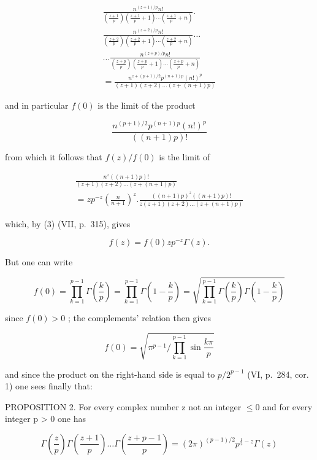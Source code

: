 \[
\begin{array}{c} \frac {n ^ {(z + 1) / p} n !}{\left(\frac {z + 1}{p}\right) \left(\frac {z + 1}{p} + 1\right) \cdots \left(\frac {z + 1}{p} + n\right)}. \\ \frac {n ^ {(z + 2) / p} n !}{\left(\frac {z + 2}{p}\right) \left(\frac {z + 2}{p} + 1\right) \cdots \left(\frac {z + 2}{p} + n\right)} \dots \\ \dots \frac {n ^ {(z + p) / p} n !}{\left(\frac {z + p}{p}\right) \left(\frac {z + p}{p} + 1\right) \cdots \left(\frac {z + p}{p} + n\right)} \\ = \frac {n ^ {z + (p + 1) / 2} p ^ {(n + 1) p} (n !) ^ {p}}{(z + 1) (z + 2) \ldots (z + (n + 1) p)} \end{array}
\]

and in particular \(f(0)\) is the limit of the product

\[
\frac {n ^ {(p + 1) / 2} p ^ {(n + 1) p} (n !) ^ {p}}{((n + 1) p) !}
\]

from which it follows that \(f(z) / f(0)\) is the limit of

\[
\begin{array}{c} \frac {n ^ {z} ((n + 1) p) !}{(z + 1) (z + 2) \dots (z + (n + 1) p)} \\ = z   p ^ {- z} \left(\frac {n}{n + 1}\right) ^ {z}. \frac {((n + 1) p) ^ {z} ((n + 1) p) !}{z (z + 1) (z + 2) \dots (z + (n + 1) p)} \end{array}
\]

which, by (3) (VII, p.~315), gives

\[
f (z) = f (0) z p ^ {- z} \Gamma (z).\tag{11}
\]

But one can write

\[
f (0) = \prod_ {k = 1} ^ {p - 1} \Gamma \left(\frac {k}{p}\right) = \prod_ {k = 1} ^ {p - 1} \Gamma \left(1 - \frac {k}{p}\right) = \sqrt {\prod_ {k = 1} ^ {p - 1} \Gamma \left(\frac {k}{p}\right) \Gamma \left(1 - \frac {k}{p}\right)}
\]

since \(f(0) > 0\) ; the complements' relation then gives

\[
f (0) = \sqrt {\pi^ {p - 1} / \prod_ {k = 1} ^ {p - 1} \sin \frac {k \pi}{p}}
\]

and since the product on the right-hand side is equal to \(p/2^{p-1}\) (VI, p.~284, cor. 1) one sees finally that:

PROPOSITION 2. For every complex number z not an integer \(\leqslant 0\) and for every integer p \textgreater{} 0 one has

\[
\Gamma \left(\frac {z}{p}\right) \Gamma \left(\frac {z + 1}{p}\right) \dots \Gamma \left(\frac {z + p - 1}{p}\right) = (2 \pi) ^ {(p - 1) / 2} p ^ {\frac {1}{2} - z} \Gamma (z)\tag{12}
\]

